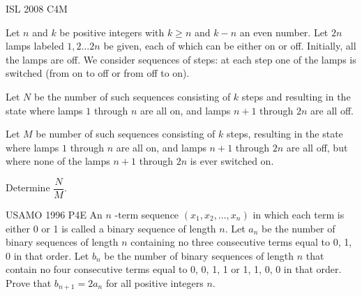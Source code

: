{ISL 2008 C4}{M}{
    Let $ n $ and $ k $ be positive integers with $ k\geq n $ and $k-n$ 
    an even number. Let $ 2n $ lamps labeled $ 1,2\dots 2n $ be given, each
    of which can be either on or off. Initially, all the lamps are off. We
    consider sequences of steps: at each step one of the lamps is switched
    (from on to off or from off to on).

    Let $ N $ be the number of such sequences consisting of $ k $ steps and
    resulting in the state where lamps $ 1 $ through $ n $ are all on, and
    lamps $ n+1 $ through $ 2n $ are all off.

    Let $ M $ be number of such sequences consisting of $ k $ steps, resulting
    in the state where lamps $ 1 $ through $ n $ are all on, and lamps $ n+1 $
    through $ 2n $ are all off, but where none of the lamps $ n+1 $ through $
    2n $ is ever switched on.

    Determine $ \dfrac{N}{M} $.
}\label{problem:bijection_5}



{USAMO 1996 P4}{E}{
    An $ n $ -term sequence $ (x_1, x_2, \ldots, x_n) $ in which each term
    is either 0 or 1 is called a binary sequence of length $ n $. Let $ a_n $ be
    the number of binary sequences of length $ n $ containing no three consecutive
    terms equal to 0, 1, 0 in that order. Let $ b_n $ be the number of binary
    sequences of length $ n $ that contain no four consecutive terms equal to 0,
    0, 1, 1 or 1, 1, 0, 0 in that order. Prove that $ b_{n+1} = 2a_n $ for all
    positive integers $ n $.
}\label{problem:bijection_4}

